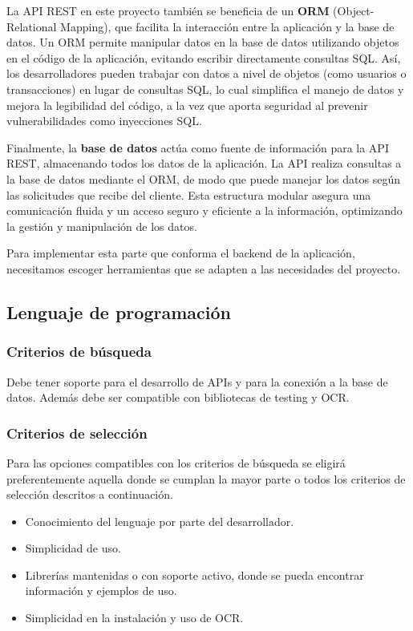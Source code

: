 La API REST en este proyecto también se beneficia de un \textbf{ORM} (Object-Relational Mapping), que facilita la interacción entre la aplicación y la base de datos. Un ORM permite manipular datos en la base de datos utilizando objetos en el código de la aplicación, evitando escribir directamente consultas SQL. Así, los desarrolladores pueden trabajar con datos a nivel de objetos (como usuarios o transacciones) en lugar de consultas SQL, lo cual simplifica el manejo de datos y mejora la legibilidad del código, a la vez que aporta seguridad al prevenir vulnerabilidades como inyecciones SQL.

Finalmente, la \textbf{base de datos} actúa como fuente de información para la API REST, almacenando todos los datos de la aplicación. La API realiza consultas a la base de datos mediante el ORM, de modo que puede manejar los datos según las solicitudes que recibe del cliente. Esta estructura modular asegura una comunicación fluida y un acceso seguro y eficiente a la información, optimizando la gestión y manipulación de los datos.

Para implementar esta parte que conforma el backend de la aplicación, necesitamos escoger herramientas que se adapten a las necesidades del proyecto.

\subsection{Lenguaje de programación}
\subsubsection{Criterios de búsqueda}
Debe tener soporte para el desarrollo de APIs y para la conexión a la base de datos. Además debe ser compatible con bibliotecas de testing y OCR.

\subsubsection{Criterios de selección}
Para las opciones compatibles con los criterios de búsqueda se eligirá preferentemente aquella donde se cumplan la mayor parte o todos los criterios de selección descritos a continuación.

\begin{itemize}
    \item Conocimiento del lenguaje por parte del desarrollador.
    \item Simplicidad de uso.
    \item Librerías mantenidas o con soporte activo, donde se pueda encontrar información y ejemplos de uso.
    \item Simplicidad en la instalación y uso de OCR.
\end{itemize}


